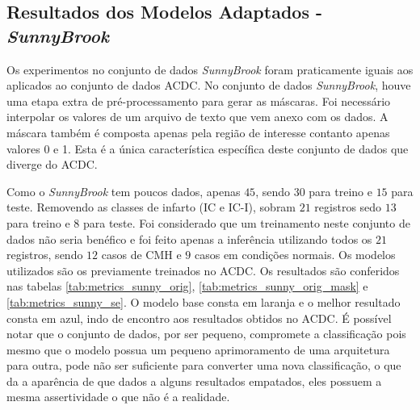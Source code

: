 \subsection{Resultados dos Modelos Adaptados - \textit{SunnyBrook}}
\label{subsec:resultados_sunny_adaptado}

Os experimentos no conjunto de dados \textit{SunnyBrook} foram praticamente iguais aos aplicados ao conjunto de dados \gls{ACDC}. No conjunto de dados \textit{SunnyBrook}, houve uma etapa extra de pré-processamento para gerar as máscaras. Foi necessário interpolar os valores de um arquivo de texto que vem anexo com os dados. A máscara também é composta apenas pela região de interesse contanto apenas valores 0 e 1. Esta é a única característica específica deste conjunto de dados que diverge do \gls{ACDC}.

Como o \textit{SunnyBrook} tem poucos dados, apenas $45$, sendo $30$ para treino e $15$ para teste. Removendo as classes de infarto (IC e IC-I), sobram $21$ registros sedo $13$ para treino e $8$ para teste. Foi considerado que um treinamento neste conjunto de dados não seria benéfico e foi feito apenas a inferência utilizando todos os $21$ registros, sendo $12$ casos de \gls{CMH} e $9$ casos em condições normais. Os modelos utilizados são os previamente treinados no \gls{ACDC}. Os resultados são conferidos nas tabelas \ref{tab:metrics_sunny_orig}, \ref{tab:metrics_sunny_orig_mask} e \ref{tab:metrics_sunny_se}. O modelo base consta em laranja e o melhor resultado consta em azul, indo de encontro aos resultados obtidos no \gls{ACDC}. É possível notar que o conjunto de dados, por ser pequeno, compromete a classificação pois mesmo que o modelo possua um pequeno aprimoramento de uma arquitetura para outra, pode não ser suficiente para converter uma nova classificação, o que da a aparência de que dados a alguns resultados empatados, eles possuem a mesma assertividade o que não é a realidade.


